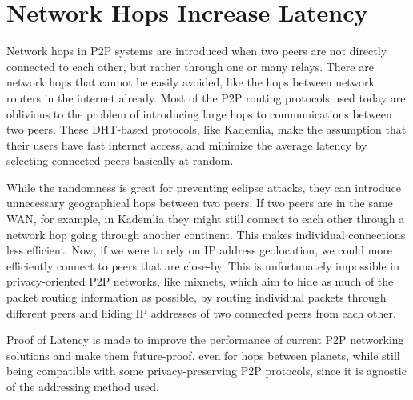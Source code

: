 \section{Network Hops Increase Latency}
Network hops in P2P systems are introduced when two peers are not directly connected to each other, but rather through one or many relays. There are network hops that cannot be easily avoided, like the hops between network routers in the internet already. Most of the P2P routing protocols used today are oblivious to the problem of introducing large hops to communications between two peers. These DHT-based protocols, like Kademlia, make the assumption that their users have fast internet access, and minimize the average latency by selecting connected peers basically at random.

While the randomness is great for preventing eclipse attacks, they can introduce unnecessary geographical hops between two peers. If two peers are in the same WAN, for example, in Kademlia they might still connect to each other through a network hop going through another continent. This makes individual connections less efficient.
Now, if we were to rely on IP address geolocation, we could more efficiently connect to peers that are close-by. This is unfortunately impossible in privacy-oriented P2P networks, like mixnets, which aim to hide as much of the packet routing information as possible, by routing individual packets through different peers and hiding IP addresses of two connected peers from each other.\cite{Harry_Halpin_undated-sq}

Proof of Latency is made to improve the performance of current P2P networking solutions and make them future-proof, even for hops between planets, while still being compatible with some privacy-preserving P2P protocols, since it is agnostic of the addressing method used.

